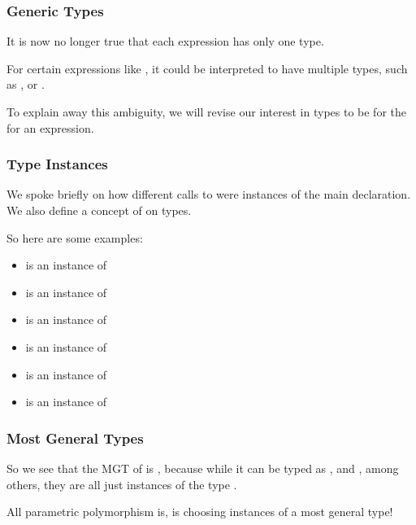 \documentclass[aspectratio=169]{beamer}
\begin{document}
\begin{frame}[fragile]
  \frametitle{Generic Types}

  It is now no longer true that each expression has only one type. 

  For certain expressions like , it could be 
  interpreted to have multiple types, such as , or .

  To explain away this ambiguity, we will revise our interest in types to be 
  for the  for an expression.

\end{frame}

\begin{frame}[fragile]
  \frametitle{Type Instances}

  We spoke briefly on how different calls to  were instances of
  the main declaration. We also define a concept of  on types. 


  So here are some examples:
  \begin{itemize}
    \item {} is an instance of  
    \item {} is an instance of  
    \item {} is an instance of  
    \item {} is an instance of  
    \item {} is an instance of 
    \item {} is an instance of 
  \end{itemize}
\end{frame}

\begin{frame}[fragile]
  \frametitle{Most General Types}

  So we see that the MGT of  is ,
  because while it can be typed as , and 
  , among others, they are all just instances 
  of the type . 

  All parametric polymorphism is, is choosing instances of a most general
  type!
\end{frame}
\end{document}

